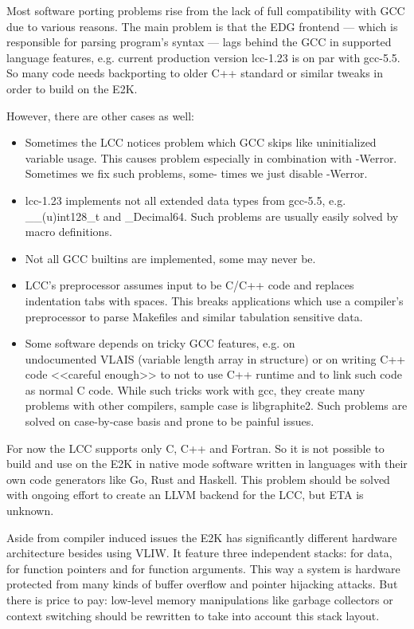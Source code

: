 \documentclass[10pt, a5paper]{article}
\begin{document}
Most software porting problems rise from the lack of full compatibility with GCC due to various reasons. The main problem is that the EDG frontend — which is responsible for parsing program's syntax — lags behind the GCC in supported language features, e.g. current production version lcc-1.23 is on par with gcc-5.5. So many code needs backporting to older C++ standard or similar tweaks in order to build on the E2K.

However, there are other cases as well:

\begin{itemize}
  \item Sometimes the LCC notices problem which GCC skips like \newline uninitialized variable usage. This causes problem especially in combination with -Werror. Sometimes we fix such problems, some- times we just disable -Werror.
  \item lcc-1.23 implements not all extended data types from gcc-5.5, e.g. \_\_(u)int128\_t and \_Decimal64. Such problems are usually easily solved by macro definitions.
  \item Not all GCC builtins are implemented, some may never be.
  \item LCC's preprocessor assumes input to be C/C++ code and replaces indentation tabs with spaces. This breaks applications which use a compiler's preprocessor to parse Makefiles and similar tabulation sensitive data.
  \item Some software depends on tricky GCC features, e.g. on \\undocumented VLAIS (variable length array in structure) or on writing C++ code <<careful enough>> to not to use C++ runtime and to link such code as normal C code. While such tricks work with gcc, they create many problems with other compilers, sample case is libgraphite2.  Such problems are solved on case-by-case basis and prone to be painful issues.
\end{itemize}

For now the LCC supports only C, C++ and Fortran. So it is not possible to build and use on the E2K in native mode software written in languages with their own code generators like Go, Rust and Haskell. This problem should be solved with ongoing effort to create an LLVM backend for the LCC, but ETA is unknown.

Aside from compiler induced issues the E2K has significantly different hardware architecture besides using VLIW. It feature three independent stacks: for data, for function pointers and for function arguments. This way a system is hardware protected from many kinds of buffer overflow and pointer hijacking attacks. But there is price to pay: low-level memory manipulations like garbage collectors or context switching should be rewritten to take into account this stack layout.
\end{document}
